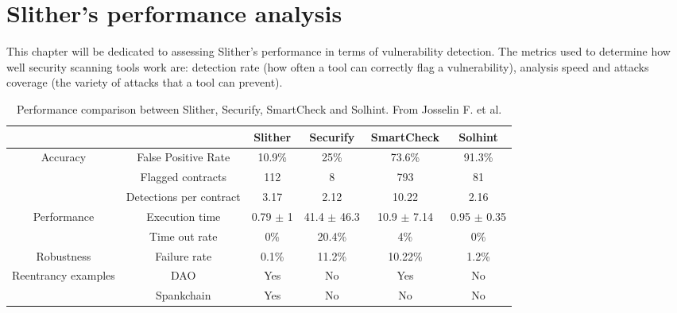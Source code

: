 \chapter{Slither's performance analysis}
This chapter will be dedicated to assessing Slither's performance in terms of vulnerability detection. The metrics used to determine how well security scanning tools work are: detection rate (how often a tool can correctly flag a vulnerability), analysis speed and attacks coverage (the variety of attacks that a tool can prevent).

\begin{table}[h]
\small
\begin{tabular}{cc|cccc|}
\cline{3-6}
                                                           &                         & \multicolumn{1}{c|}{Slither} & \multicolumn{1}{c|}{Securify} & \multicolumn{1}{c|}{SmartCheck} & Solhint       \\ \hline
\multicolumn{1}{|c|}{\multirow{3}{*}{Accuracy}}            & False Positive Rate     & 10.9\%                       & 25\%                          & 73.6\%                          & 91.3\%        \\
\multicolumn{1}{|c|}{}                                     & Flagged contracts       & 112                          & 8                             & 793                             & 81            \\
\multicolumn{1}{|c|}{}                                     & Detections per contract & 3.17                         & 2.12                          & 10.22                           & 2.16          \\ \hline
\multicolumn{1}{|c|}{\multirow{2}{*}{Performance}}         & Execution time  & 0.79 $\pm$ 1                   & 41.4 $\pm$ 46.3  & 10.9 $\pm$ 7.14                   & 0.95 $\pm$ 0.35 \\
\multicolumn{1}{|c|}{}                                     & Time out rate           & 0\%                          & 20.4\%                        & 4\%                             & 0\%           \\ \hline
\multicolumn{1}{|c|}{Robustness}                           & Failure rate            & 0.1\%                        & 11.2\%                        & 10.22\%                         & 1.2\%         \\ \hline
\multicolumn{1}{|c|}{\multirow{2}{*}{Reentrancy examples}} & DAO                     & Yes                          & No                            & Yes                             & No            \\
\multicolumn{1}{|c|}{}                                     & Spankchain              & Yes                          & No                            & No                              & No            \\ \hline
\end{tabular}
\caption{Performance comparison between Slither, Securify, SmartCheck and Solhint. From Josselin F. et al.\cite{slither}}
\label{tab:my-table}
\end{table}

